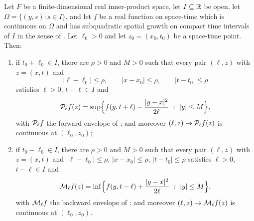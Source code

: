 \begin{lemma}
Let $F$ be a finite-dimensional real inner-product space, let $I\subseteq\mathbb{R}$ be
open, let $\Omega=\{(y,s):s\in I\}$, and let $f$ be a real function on space-time
which is continuous on $\Omega$ and has subquadratic spatial growth on compact
time intervals of $I$ in the sense of . Let
$\ell_0>0$ and let $z_0=(x_0,t_0)$ be a space-time point. Then:
\begin{enumerate}
\item if $t_0+\ell_0\in I$, there are $\rho>0$ and $M>0$ such that every pair
$(\ell,z)$ with $z=(x,t)$ and
\[
  |\ell-\ell_0|\le\rho,\qquad|x-x_0|\le\rho,\qquad|t-t_0|\le\rho
\]
satisfies $\ell>0$, $t+\ell\in I$ and
\[
  \mathcal{P}_\ell f(z)
  =\sup\Bigl\{f(y,t+\ell)-\frac{|y-x|^2}{2\ell}\ :\ |y|\le M\Bigr\},
\]
with $\mathcal{P}_\ell f$ the forward envelope of ; and moreover
$(\ell,z)\mapsto\mathcal{P}_\ell f(z)$ is continuous at $(\ell_0,z_0)$;
\item if $t_0-\ell_0\in I$, there are $\rho>0$ and $M>0$ such that every pair
$(\ell,z)$ with $z=(x,t)$ and $|\ell-\ell_0|\le\rho$, $|x-x_0|\le\rho$,
$|t-t_0|\le\rho$ satisfies $\ell>0$, $t-\ell\in I$ and
\[
  \mathcal{M}_\ell f(z)
  =\inf\Bigl\{f(y,t-\ell)+\frac{|y-x|^2}{2\ell}\ :\ |y|\le M\Bigr\},
\]
with $\mathcal{M}_\ell f$ the backward envelope of ; and moreover
$(\ell,z)\mapsto\mathcal{M}_\ell f(z)$ is continuous at $(\ell_0,z_0)$.
\end{enumerate}
\end{lemma}
